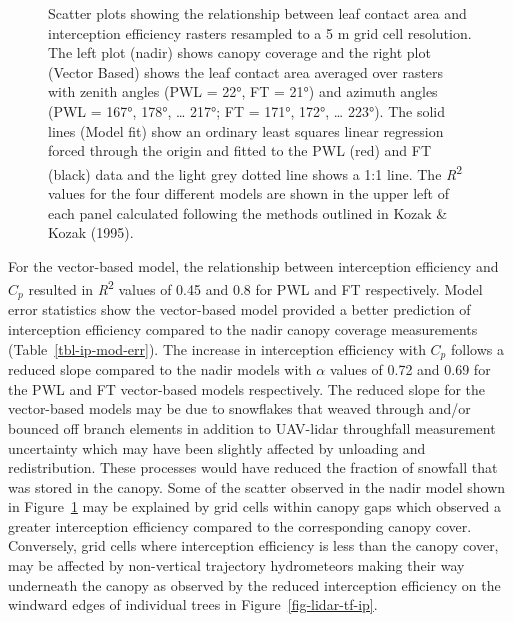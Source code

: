 \documentclass[
  letterpaper,
  DIV=11,
  numbers=noendperiod]{scrartcl}
\begin{document}
\begin{figure}[H]


\caption{\label{fig-lca-vs-ip}Scatter plots showing the relationship
between leaf contact area and interception efficiency rasters resampled
to a 5 m grid cell resolution. The left plot (nadir) shows canopy
coverage and the right plot (Vector Based) shows the leaf contact area
averaged over rasters with zenith angles (PWL = 22°, FT = 21°) and
azimuth angles (PWL = 167°, 178°, \ldots{} 217°; FT = 171°, 172°,
\ldots{} 223°). The solid lines (Model fit) show an ordinary least
squares linear regression forced through the origin and fitted to the
PWL (red) and FT (black) data and the light grey dotted line shows a 1:1
line. The \emph{R}\textsuperscript{2} values for the four different
models are shown in the upper left of each panel calculated following
the methods outlined in Kozak \& Kozak (1995).}

\end{figure}%

For the vector-based model, the relationship between interception
efficiency and \(C_p\) resulted in \emph{R}\textsuperscript{2} values of
0.45 and 0.8 for PWL and FT respectively. Model error statistics show
the vector-based model provided a better prediction of interception
efficiency compared to the nadir canopy coverage measurements
(Table~\ref{tbl-ip-mod-err}). The increase in interception efficiency
with \(C_p\) follows a reduced slope compared to the nadir models with
\(\alpha\) values of 0.72 and 0.69 for the PWL and FT vector-based
models respectively. The reduced slope for the vector-based models may
be due to snowflakes that weaved through and/or bounced off branch
elements in addition to UAV-lidar throughfall measurement uncertainty
which may have been slightly affected by unloading and redistribution.
These processes would have reduced the fraction of snowfall that was
stored in the canopy. Some of the scatter observed in the nadir model
shown in Figure~\ref{fig-lca-vs-ip} may be explained by grid cells
within canopy gaps which observed a greater interception efficiency
compared to the corresponding canopy cover. Conversely, grid cells where
interception efficiency is less than the canopy cover, may be affected
by non-vertical trajectory hydrometeors making their way underneath the
canopy as observed by the reduced interception efficiency on the
windward edges of individual trees in Figure~\ref{fig-lidar-tf-ip}.
\end{document}
